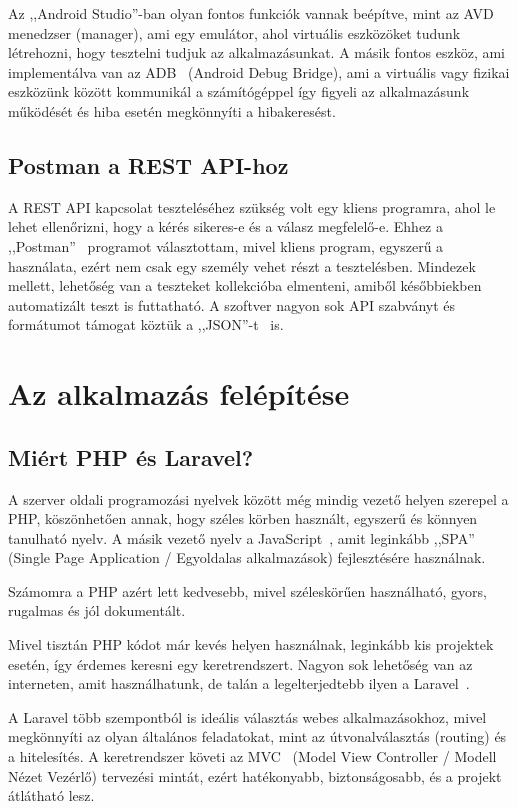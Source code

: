 \documentclass[
]{thesis-ekf}
\theoremstyle{definition}
\theoremstyle{remark}
\begin{document}
	Az ,,Android Studio''-ban olyan fontos funkciók vannak beépítve, mint az AVD~\cite{androidStudioAvd_doc} menedzser (manager), ami egy emulátor, ahol virtuális eszközöket tudunk létrehozni, hogy tesztelni tudjuk az alkalmazásunkat. A másik fontos eszköz, ami implementálva van az ADB~\cite{androidStudioAdb_doc} (Android Debug Bridge), ami a virtuális vagy fizikai eszközünk között kommunikál a számítógéppel így figyeli az alkalmazásunk működését és hiba esetén megkönnyíti a hibakeresést. 
	
	\section{Postman a REST API-hoz}
	A REST API kapcsolat teszteléséhez szükség volt egy kliens programra, ahol le lehet ellenőrizni, hogy a kérés sikeres-e és a válasz megfelelő-e. Ehhez a ,,Postman''~\cite{postman_doc} programot választottam, mivel kliens program, egyszerű a használata, ezért nem csak egy személy vehet részt a tesztelésben. Mindezek mellett, lehetőség van a teszteket kollekcióba elmenteni, amiből későbbiekben automatizált teszt is futtatható. A szoftver nagyon sok API szabványt és formátumot támogat köztük a ,,JSON''-t~\cite{json_doc} is.
	
	\chapter{Az alkalmazás felépítése}
	\section{Miért PHP és Laravel?}
	A szerver oldali programozási nyelvek között még mindig vezető helyen szerepel a PHP, köszönhetően annak, hogy széles körben használt, egyszerű és könnyen tanulható nyelv. A másik vezető nyelv a JavaScript~\cite{js_book}, amit leginkább ,,SPA'' (Single Page Application / Egyoldalas alkalmazások) fejlesztésére használnak. 
	
	Számomra a PHP azért lett kedvesebb, mivel széleskörűen használható, gyors, rugalmas és jól dokumentált. 
	
	Mivel tisztán PHP kódot már kevés helyen használnak, leginkább kis projektek esetén, így érdemes keresni egy keretrendszert. Nagyon sok lehetőség van az interneten, amit használhatunk, de talán a legelterjedtebb ilyen a Laravel~\cite{laravel_book}. 
	
	A Laravel több szempontból is ideális választás webes alkalmazásokhoz, mivel megkönnyíti az olyan általános feladatokat, mint az útvonalválasztás (routing) és a hitelesítés. A keretrendszer követi az MVC~\cite{mvc_pattern} (Model View Controller / Modell Nézet Vezérlő) tervezési mintát, ezért hatékonyabb, biztonságosabb, és a projekt átlátható lesz. 
	
\end{document}
